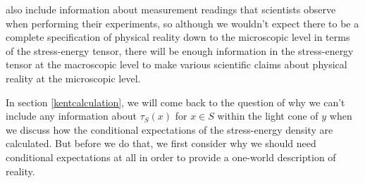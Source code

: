 also include information about measurement readings that scientists observe when performing their experiments, so although  we wouldn't expect there to be a complete specification of physical reality down to the microscopic level in terms of the stress-energy tensor, there will be enough information in the stress-energy tensor at the macroscopic level to make various scientific claims about physical reality at the microscopic level.  

In section \ref{kentcalculation}, we will come back to the question of why we can't include any information about $\tau_S(x)$ for $x\in S$ within the light cone of $y$ when we discuss how the conditional expectations of the stress-energy density are calculated. But before we do that, we first consider why we should need conditional expectations at all in order to provide a one-world description of reality.


